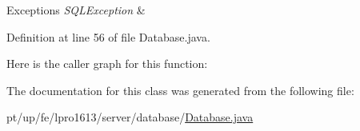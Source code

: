 \begin{DoxyExceptions}{Exceptions}
{\em S\+Q\+L\+Exception} & \\
\hline
\end{DoxyExceptions}


Definition at line 56 of file Database.\+java.

Here is the caller graph for this function\+:


The documentation for this class was generated from the following file\+:\begin{DoxyCompactItemize}
\item 
pt/up/fe/lpro1613/server/database/\hyperlink{_database_8java}{Database.\+java}\end{DoxyCompactItemize}
